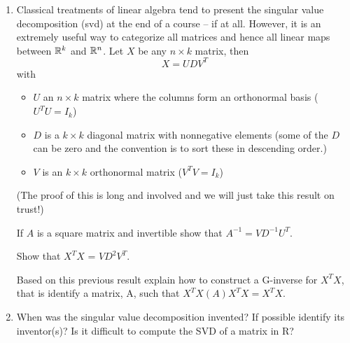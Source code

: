 \documentclass[11pt]{article}
\begin{document}
\begin{enumerate}
\item Classical treatments of linear algebra tend to present the singular value decomposition (svd) at the end of a course -- if at all. However, it is an extremely useful way to categorize all matrices and hence all linear maps between 
${\Bbb R}^k $ and ${\Bbb R}^n$.  Let $X$ be any $n \times k $ matrix, then 
\[ X = U D  V^T \]  with 
\begin{itemize}
\item  $U$ an $n \times k $ matrix where the columns form an orthonormal basis ( $U^TU = I_k$) 
\item  $D$ is a  $k \times k $ diagonal matrix with nonnegative elements (some of the $D$ can be zero and the convention is to sort these in descending order.) 
\item  $ V$ is an $k \times k $ orthonormal matrix  ($ V^T  V = I _k$) 
\end{itemize}
(The proof of this is long and involved and we will just take this result on trust!)

If  $A$ is a square matrix and invertible show  that  $A^{-1} = V D^{-1} U^T $.

Show that  $X^T X$ = $  V D^2 V^T$. 

Based on this previous result explain how to construct a G-inverse for $X^T X$, that is identify a matrix, A, such that
$X^T X( A )X^T X = X^T X$.


\item When was the singular value decomposition invented? If possible identify its inventor(s)? 
Is it difficult to  compute the SVD of a matrix in R?

\end{enumerate}
%
%
%
%
%
%
%
%
\end{document}
